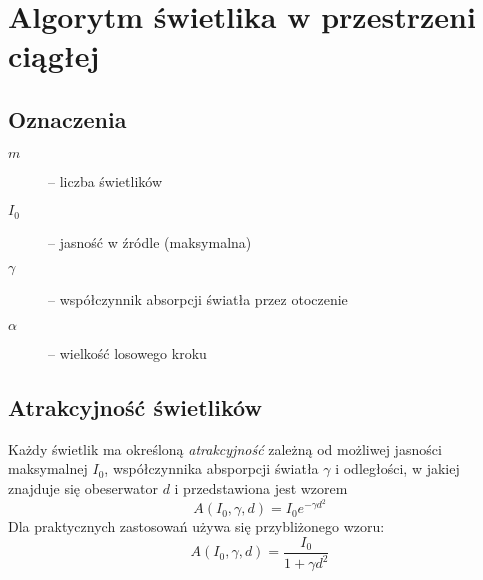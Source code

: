 \documentclass[12pt]{article}
\begin{document}

\section{Algorytm świetlika w przestrzeni ciągłej}
\subsection{Oznaczenia} 
\begin{description}
 \item[$m$] -- liczba świetlików
 \item[$I_0$] -- jasność w źródle (maksymalna)
 \item[$\gamma$] -- współczynnik absorpcji światła przez otoczenie
 \item[$\alpha$] -- wielkość losowego kroku
 
 \end{description}
 \subsection{Atrakcyjność świetlików}
 Każdy świetlik ma określoną \emph{atrakcyjność} zależną od możliwej jasności maksymalnej $I_0$, współczynnika absporpcji światła $\gamma$ i odległości, w jakiej znajduje się obeserwator $d$ i przedstawiona jest wzorem
 \begin{equation}
 A(I_0,\gamma, d) = I_0 e^{-\gamma d^2}
 \end{equation}
 Dla praktycznych zastosowań używa się przybliżonego wzoru:
 \begin{equation}
  A(I_0,\gamma, d) = \frac{I_0}{1+\gamma d^2}
 \end{equation}
\end{document}
